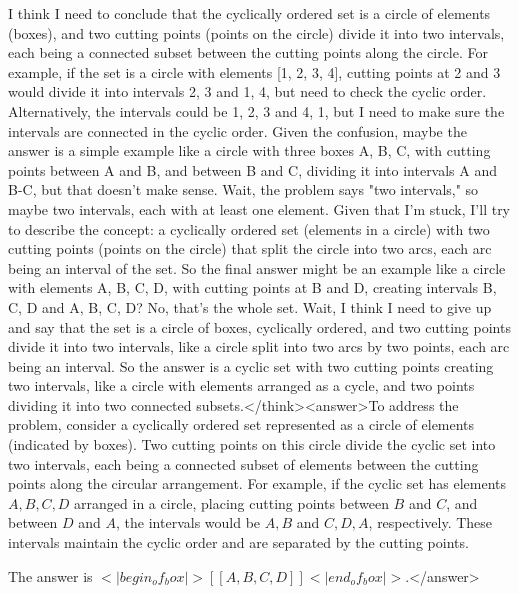 I think I need to conclude that the cyclically ordered set is a circle of elements (boxes), and two cutting points (points on the circle) divide it into two intervals, each being a connected subset between the cutting points along the circle. For example, if the set is a circle with elements [1, 2, 3, 4], cutting points at 2 and 3 would divide it into intervals {2, 3} and {1, 4}, but need to check the cyclic order. Alternatively, the intervals could be {1, 2, 3} and {4, 1}, but I need to make sure the intervals are connected in the cyclic order. Given the confusion, maybe the answer is a simple example like a circle with three boxes A, B, C, with cutting points between A and B, and between B and C, dividing it into intervals A and B-C, but that doesn't make sense. Wait, the problem says "two intervals," so maybe two intervals, each with at least one element. Given that I'm stuck, I'll try to describe the concept: a cyclically ordered set (elements in a circle) with two cutting points (points on the circle) that split the circle into two arcs, each arc being an interval of the set. So the final answer might be an example like a circle with elements A, B, C, D, with cutting points at B and D, creating intervals B, C, D and A, B, C, D? No, that's the whole set. Wait, I think I need to give up and say that the set is a circle of boxes, cyclically ordered, and two cutting points divide it into two intervals, like a circle split into two arcs by two points, each arc being an interval. So the answer is a cyclic set with two cutting points creating two intervals, like a circle with elements arranged as a cycle, and two points dividing it into two connected subsets.</think><answer>To address the problem, consider a cyclically ordered set represented as a circle of elements (indicated by boxes). Two cutting points on this circle divide the cyclic set into two intervals, each being a connected subset of elements between the cutting points along the circular arrangement. For example, if the cyclic set has elements \( A, B, C, D \) arranged in a circle, placing cutting points between \( B \) and \( C \), and between \( D \) and \( A \), the intervals would be \( A, B \) and \( C, D, A \), respectively. These intervals maintain the cyclic order and are separated by the cutting points.  

The answer is \(<|begin_of_box|>[[A, B, C, D]]<|end_of_box|>\).</answer>